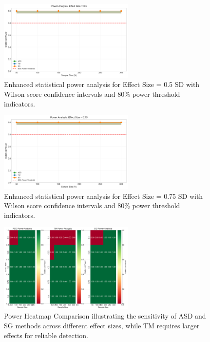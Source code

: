 \documentclass[final,3p,fleqn, 10pt]{elsarticle}
\begin{document}
\begin{figure}[htb!]
    \centering
    \includegraphics[width=0.6\textwidth]{stage4_enhanced_visualizations/power_enhanced/power_curve_enhanced_es_0p5.png}
    \caption{Enhanced statistical power analysis for Effect Size = 0.5 SD with Wilson score confidence intervals and 80\% power threshold indicators.}
    \label{fig:power_curve_0p5}
\end{figure}

\begin{figure}[htb!]
    \centering
    \includegraphics[width=0.6\textwidth]{stage4_enhanced_visualizations/power_enhanced/power_curve_enhanced_es_0p75.png}
    \caption{Enhanced statistical power analysis for Effect Size = 0.75 SD with Wilson score confidence intervals and 80\% power threshold indicators.}
    \label{fig:power_curve_0p75}
\end{figure}

\begin{figure}[htb!]
    \centering
    \includegraphics[width=0.6\textwidth]{stage4_enhanced_visualizations/power_enhanced/power_heatmap_comparison.png}
    \caption{Power Heatmap Comparison illustrating the sensitivity of ASD and SG methods across different effect sizes, while TM requires larger effects for reliable detection.}
    \label{fig:power_heatmap}
\end{figure}
\end{document}
